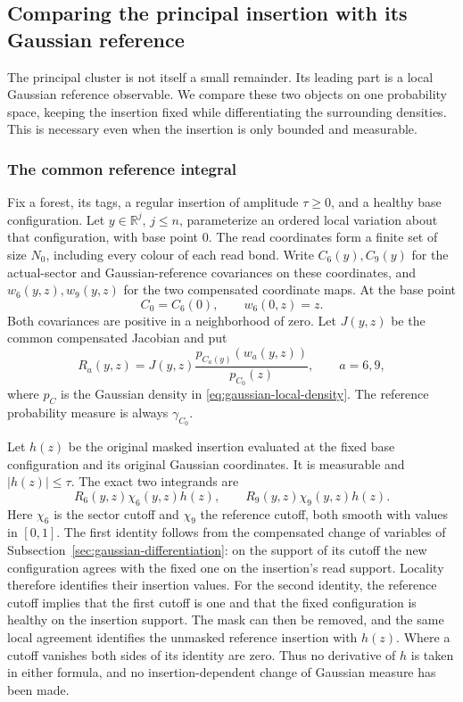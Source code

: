 \subsection{Comparing the principal insertion with its Gaussian reference}
\label{sec:principal-gaussian-comparison}
The principal cluster is not itself a small remainder. Its leading
part is a local Gaussian reference observable. We compare these two
objects on one probability space, keeping the insertion fixed while
differentiating the surrounding densities. This is necessary even
when the insertion is only bounded and measurable.

\subsubsection{The common reference integral}
Fix a forest, its tags, a regular insertion of amplitude $\tau\ge0$,
and a healthy base configuration. Let $y\in\mathbb R^j$, $j\le n$,
parameterize an ordered local variation about that configuration,
with base point $0$. The read coordinates form a finite set of size
$N_0$, including every colour of each read bond. Write
$C_6(y),C_9(y)$ for the actual-sector and Gaussian-reference
covariances on these coordinates, and $w_6(y,z),w_9(y,z)$ for
the two compensated coordinate maps. At the base point
\[
                    C_0=C_6(0),\qquad w_6(0,z)=z.
\]
Both covariances are positive in a neighborhood of zero.
Let $J(y,z)$ be the common compensated Jacobian and put
\[
 R_a(y,z)=J(y,z)\frac{p_{C_a(y)}(w_a(y,z))}{p_{C_0}(z)},
                                     \qquad a=6,9,
\]
where $p_C$ is the Gaussian density in
\eqref{eq:gaussian-local-density}. The reference probability
measure is always $\gamma_{C_0}$.

Let $h(z)$ be the original masked insertion evaluated at the fixed
base configuration and its original Gaussian coordinates. It is
measurable and $|h(z)|\le\tau$. The exact two integrands are
\begin{equation}\label{eq:principal-two-integrands}
 R_6(y,z)\chi_6(y,z)h(z),\qquad
 R_9(y,z)\chi_9(y,z)h(z).
\end{equation}
Here $\chi_6$ is the sector cutoff and $\chi_9$ the reference
cutoff, both smooth with values in $[0,1]$. The first identity
follows from the compensated change of variables of
Subsection~\ref{sec:gaussian-differentiation}: on the support of its
cutoff the new configuration agrees with the fixed one on the
insertion's read support. Locality therefore identifies their
insertion values. For the second identity, the reference cutoff
implies that the first cutoff is one and that the fixed configuration
is healthy on the insertion support. The mask can then be removed,
and the same local agreement identifies the unmasked reference
insertion with $h(z)$. Where a cutoff vanishes both sides of its
identity are zero. Thus no derivative of $h$ is taken in either
formula, and no insertion-dependent change of Gaussian measure
has been made.

